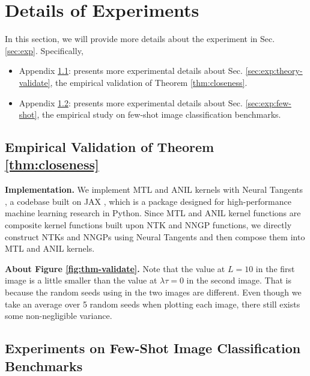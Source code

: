 \documentclass{article}
\begin{document}
\section{Details of Experiments}\label{supp:exp}
In this section, we will provide more details about the experiment in Sec. \ref{sec:exp}. Specifically,
\begin{itemize}
    \item Appendix \ref{supp:exp:theory-validate}: presents more experimental details about Sec. \ref{sec:exp:theory-validate}, the empirical validation of Theorem \ref{thm:closeness}.
    \item Appendix \ref{supp:exp:few-shot}: presents more experimental details about Sec. \ref{sec:exp:few-shot}, the empirical study on few-shot image classification benchmarks.
\end{itemize}
\subsection{Empirical Validation of Theorem \ref{thm:closeness}}\label{supp:exp:theory-validate}

\textbf{Implementation.} We implement MTL and ANIL kernels with Neural Tangents \cite{neuraltangents2020}, a codebase built on JAX \cite{jax2018github}, which is a package designed for high-performance machine learning research in Python. Since MTL and ANIL kernel functions are composite kernel functions built upon NTK and NNGP functions, we directly construct NTKs and NNGPs using Neural Tangents and then compose them into MTL and ANIL kernels. 


\textbf{About Figure \ref{fig:thm-validate}.} Note that the value at $L=10$ in the first image is a little smaller than the value at $\lambda\tau = 0$ in the second image. That is because the random seeds using in the two images are different. Even though we take an average over 5 random seeds when plotting each image, there still exists some non-negligible variance. 

\subsection{Experiments on Few-Shot Image Classification Benchmarks} \label{supp:exp:few-shot}
\end{document}
